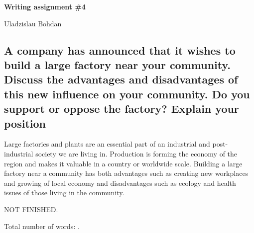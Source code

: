 \documentclass[12pt]{article}
\begin{document}
{\Large

\textbf{Writing assignment \#4}

Uladzislau Bohdan

}

\vspace{10mm}

\subsection*{A company has announced that it wishes to build a large factory
near your community. Discuss the advantages and disadvantages of this new
influence on your community. Do you support or oppose the factory?
Explain your position}

Large factories and plants are an essential part of an industrial and
post-industrial society we are living in. Production is forming the economy
of the region and makes it valuable in a country or worldwide scale. Building
a large factory near a community has both advantages such as creating new
workplaces and growing of local economy and disadvantages such as ecology and
health issues of those living in the community.

NOT FINISHED.

\vspace{15mm}

Total number of words: .
\end{document}

